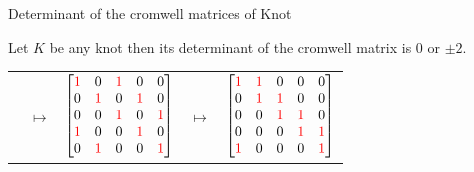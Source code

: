 \begin{frame}{Determinant of the cromwell matrices of Knot}
	\begin{thm}
		Let $K$ be any knot then its determinant of the cromwell matrix is $0$ or $\pm2$.
	\end{thm}
	\mypf
	\begin{tabu}{X[5c]X[c]X[5c]X[c]X[5c]}
			 &
			$\longmapsto$ &
			$\begin{bmatrix}
				\textcolor{red}{1} & 0 & \textcolor{red}{1} & 0 & 0\\
				0 & \textcolor{red}{1} & 0 & \textcolor{red}{1} & 0\\
				0 & 0 & \textcolor{red}{1} & 0 & \textcolor{red}{1}\\
				\textcolor{red}{1} & 0 & 0 & \textcolor{red}{1} & 0\\
				0 & \textcolor{red}{1} & 0 & 0 & \textcolor{red}{1}
			\end{bmatrix}$&
			$\longmapsto$ &
			$\begin{bmatrix}
				\textcolor{red}{1} & \textcolor{red}{1} & 0 & 0 & 0\\
				0 & \textcolor{red}{1} & \textcolor{red}{1} & 0 & 0\\
				0 & 0 & \textcolor{red}{1} & \textcolor{red}{1} & 0\\
				0 & 0 & 0 & \textcolor{red}{1} & \textcolor{red}{1}\\
				\textcolor{red}{1} & 0 & 0 & 0 & \textcolor{red}{1}
			\end{bmatrix}$
	\end{tabu}
\end{frame}
